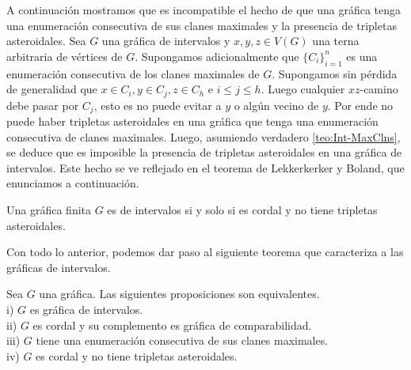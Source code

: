 A continuación mostramos que es incompatible el hecho de que una gráfica tenga
una enumeración consecutiva de sus clanes maximales y la presencia de tripletas
asteroidales. Sea $G$ una gráfica de intervalos y $x,y,z \in V(G)$ una terna
arbitraria de vértices de $G$. Supongamos adicionalmente que $\{C_i\}_{i=1}^n$
es una enumeración consecutiva de los clanes maximales de $G$. Supongamos sin
pérdida de generalidad que $x\in C_i, y \in C_j, z\in C_h$ e $i\leq j \leq h$.
Luego cualquier $xz$-camino debe pasar por $C_j$, esto es no puede evitar a $y$
o algún vecino de $y$. Por ende no puede haber tripletas asteroidales en una
gráfica que tenga una enumeración consecutiva de clanes maximales. Luego,
asumiendo verdadero \cref{teo:Int-MaxClns}, se deduce que es imposible la
presencia de tripletas asteroidales en una gráfica de intervalos. Este hecho se
ve reflejado en el teorema de Lekkerkerker y Boland, que enunciamos a
continuación.

\begin{teorema}
    \label{teo:Int-Ast-free}
    Una gráfica finita $G$ es de intervalos si y solo si es cordal y no tiene
    tripletas asteroidales.
\end{teorema}

Con todo lo anterior, podemos dar paso al siguiente teorema que caracteriza a
las gráficas de intervalos.

\begin{teorema}
\label{teo:CarGrfsInt}
    Sea $G $ una gráfica. Las siguientes proposiciones son equivalentes.\\
    i) $G$ es gráfica de intervalos.\\
    ii) $G$ es cordal y su complemento es gráfica de comparabilidad.\\
    iii) $G$ tiene una enumeración consecutiva de sus clanes maximales.\\
    iv) $G$ es cordal y no tiene tripletas asteroidales. 
\end{teorema}


